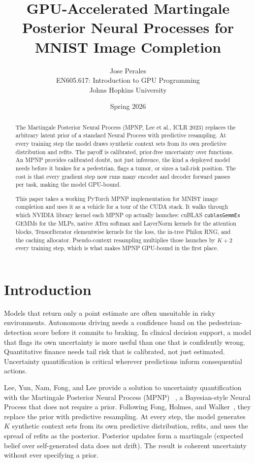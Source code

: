 \documentclass[11pt]{article}
\title{GPU-Accelerated Martingale Posterior Neural Processes for MNIST Image Completion}
\author{Jose Perales\\EN605.617: Introduction to GPU Programming\\Johns Hopkins University}
\date{Spring 2026}
\begin{document}
\maketitle

\begin{abstract}
	The Martingale Posterior Neural Process (MPNP, Lee et al., ICLR 2023)
	replaces the arbitrary latent prior of a standard Neural Process with
	predictive resampling. At every training step the model draws synthetic
	context sets from its own predictive distribution and refits. The payoff
	is calibrated, prior-free uncertainty over functions. An MPNP provides
	calibrated doubt, not just inference, the kind a deployed model needs
	before it brakes for a pedestrian, flags a tumor, or sizes a tail-risk
	position. The cost is that every gradient step now runs many encoder and
	decoder forward passes per task, making the model GPU-bound.

	This paper takes a working PyTorch MPNP implementation for MNIST image
	completion and uses it as a vehicle for a tour of the CUDA stack. It
	walks through which NVIDIA library kernel each MPNP op actually
	launches: cuBLAS \texttt{cublasGemmEx} GEMMs for the MLPs, native ATen
	softmax and LayerNorm kernels for the attention blocks, TensorIterator
	elementwise kernels for the loss, the in-tree Philox RNG, and the
	caching allocator. Pseudo-context resampling multiplies those launches
	by $K{+}2$ every training step, which is what makes MPNP GPU-bound in
	the first place.
\end{abstract}

\section{Introduction}

Models that return only a point estimate are often unsuitable in risky
environments. Autonomous driving needs a confidence band on the
pedestrian-detection score before it commits to braking. In clinical
decision support, a model that flags its own uncertainty is more useful
than one that is confidently wrong. Quantitative finance needs tail risk
that is calibrated, not just estimated. Uncertainty quantification is
critical wherever predictions inform consequential actions.

Lee, Yun, Nam, Fong, and Lee provide a solution to uncertainty
quantification with the Martingale Posterior Neural Process (MPNP)
~\cite{lee2023}, a Bayesian-style Neural Process that does not require a
prior. Following Fong, Holmes, and Walker~\cite{fong2023}, they replace
the prior with predictive resampling. At every step, the model generates
$K$ synthetic context sets from its own predictive distribution, refits,
and uses the spread of refits as the posterior. Posterior updates form a
martingale (expected belief over self-generated data does not drift). The
result is coherent uncertainty without ever specifying a prior.
\end{document}

